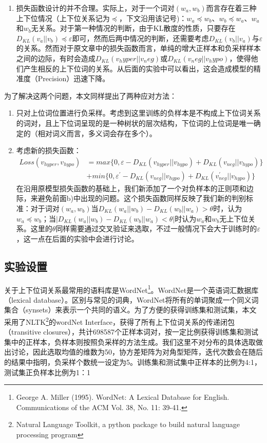 \documentclass[a4paper,13pt]{article}
\begin{document}
\begin{spacing}{1.5}
\begin{enumerate}[label=\alph*)]
\item 损失函数设计的并不合理。实际上，对于一个词对$(w_a,w_b)$而言存在着三种上下位情况（上下位关系记为$\preceq$，下文沿用该记号)：$w_a \preceq w_b$、$w_b \preceq w_a$、$w_a$和$w_b$无关系。对于第一种情况的判断，由于KL散度的性质，只要存在$D_{KL}(v_a || v_b) \preceq \varepsilon$即可，然而后两中情况的判断，还需要考虑$D_{KL}(v_b || v_a)$与$\varepsilon$的关系。然而对于原文章中的损失函数而言，单纯的增大正样本和负采样样本之间的边际，有时会造成$D_{KL}(v_hyper||v_neg)$或$D_{KL}(v_neg||v_hypo)$，使得他们产生相反的上下位词的关系。从后面的实验中可以看出，这会造成模型的精准度（Precision）迅速下降。
\end{enumerate}
为了解决这两个问题，本文同样提出了两种应对方法：
\begin{enumerate}[label=\alph*)]
\item 只对上位词位置进行负采样。考虑到这里训练的负样本是不构成上下位词关系的词对，且上下位词呈现的是一种树状的层次结构，下位词的上位词是唯一确定的（相对词义而言，多义词会存在多个）。

\item 考虑新的损失函数：
\begin{align*}
Loss(v_{hyper},v_{hypo}) &= max \{0, \varepsilon - D_{KL}(v_{hyper} || v_{hypo}) + D_{KL}(v_{neg} || v_{hypo})\} \\
                         &+ min \{0, \varepsilon^{'} - D_{KL}(v_{neg} || v_{hypo}) + D_{KL}(v_{neg}^{'} || v_{hypo})\}
\end{align*}
在沿用原模型损失函数的基础上，我们新添加了一个对负样本的正则项和边际，来避免前面b)中出现的问题。这个损失函数同样反映了我们新的判别标准：对于词对$(w_a,w_b)$当$D_{KL}(w_a||w_b)-D_{KL}(w_b||w_a) > \theta$时，认为$w_a \preceq w_b$；当$|D_{KL}(w_a||w_b)-D_{KL}(w_b||w_a) < \theta|$时认为$w_a$和$w_b$无上下位关系。这里的$\theta$同样需要通过交叉验证来选取，不过一般情况下会大于训练时的$\varepsilon$，这一点在后面的实验中会进行讨论。
\end{enumerate}

\subsection{实验设置}

关于上下位词关系最常用的语料库是WordNet\footnote{\wuhao George A. Miller (1995). WordNet: A Lexical Database for English. Communications of the ACM Vol. 38, No. 11: 39-41. }。WordNet是一个英语词汇数据库（lexical database）。区别与常见的词典，WordNet将所有的单词聚成一个同义词集合（synsets）来表示一个共同的语义。为了方便的获得训练集和测试集，本文采用了NLTK\footnote{\wuhao Natural Language Toolkit, a python package to build natural language processing program}的wordNet Interface，获得了所有上下位词关系的传递闭包（transitive closures），共计698587个正样本词对，按一定比例获得训练集和测试集中的正样本，负样本则按照负采样的方法生成。我们这里不对分布的具体选取做出讨论，因此选取均值的维数为50，协方差矩阵为对角型矩阵，迭代次数会在随后的结果中指明，负采样个数统一设定为5。训练集和测试集中正样本的比例为4:1，测试集正负样本比例为1：1


\end{spacing}
\end{document}
